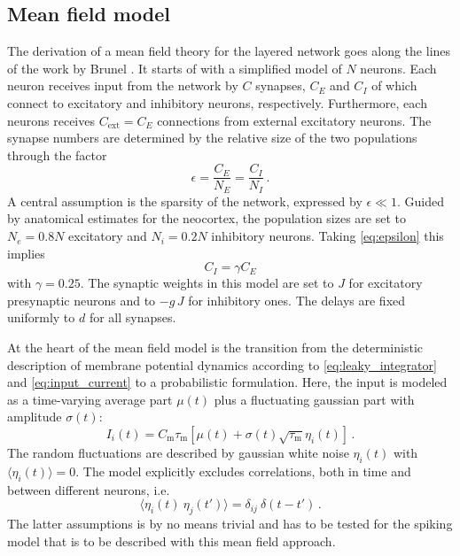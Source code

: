\subsection{Mean field model}
The derivation of a mean field theory for the layered network goes along the 
lines of the work by Brunel \cite{brunel2000}.
It starts of with a simplified model of 
$N$ neurons. Each neuron receives input from the network by $C$ synapses, $C_E$ and $C_I$ of 
which connect to excitatory and inhibitory neurons, respectively. 
Furthermore, each neurons receives $C_\text{ext} = C_E$ connections from 
external excitatory neurons.
The synapse numbers 
are determined by the relative size of the two populations through the factor
\begin{equation}
    \epsilon = \frac{C_E}{N_E} = \frac{C_I}{N_I} \,.
    \label{eq:epsilon}
\end{equation}
A central assumption is the sparsity of the network, expressed by $\epsilon \ll 1$.
Guided by anatomical estimates for the neocortex, the population sizes are set to
$N_e = 0.8N$ excitatory and $N_i = 0.2N$ inhibitory neurons. Taking \eqref{eq:epsilon}
this implies 
\begin{equation}
    C_I = \gamma C_E 	
 \label{eq:C_I}
\end{equation}
with $\gamma = 0.25$. The synaptic weights in this model are set to $J$ for 
excitatory presynaptic neurons and to $-g\, J$ for inhibitory ones. 
The delays are fixed uniformly to $d$ for all synapses. 

At the heart of the mean field model
is the transition from the deterministic description of membrane potential 
dynamics according to \eqref{eq:leaky_integrator} and \eqref{eq:input_current} to
a probabilistic formulation. Here, the input is modeled as a time-varying average part
$\mu(t)$ plus a fluctuating gaussian part with amplitude $\sigma(t)$:
\begin{equation}
    I_i(t) = C_\text{m} \tau_\text{m} \left[ \mu(t) + \sigma(t)	\sqrt{\tau_\text{m}} \eta_i(t) \right] \, .
    \label{eq:input_random}
\end{equation}
The random fluctuations are described by gaussian white noise $\eta_i(t)$ with 
$\langle  \eta_i(t)\rangle = 0$. The model explicitly excludes correlations, 
both in time and between different neurons, i.e.
\begin{equation}
    \langle \eta_i(t) \: \eta_j(t') \rangle = \delta_{ij} \: \delta(t - t')	\, . 
    \label{eq:no_correlations}
\end{equation}
The latter assumptions is by no means trivial and has to be tested for the spiking model
that is to be described with this mean field approach. 

